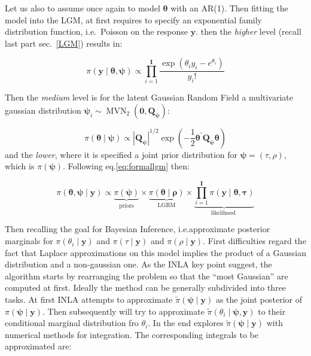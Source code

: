 \documentclass[
  12pt,
  a4paper,
  oneside]{book}
\theoremstyle{definition}
\theoremstyle{definition}
\theoremstyle{definition}
\theoremstyle{remark}
\begin{document}
Let us also to assume once again to model \(\boldsymbol\theta\) with an AR(1).
Then fitting the model into the LGM, at first requires to specify an exponential family distribution function, i.e.~Poisson on the response \(\mathbf{y}\).
then the \emph{higher} level (recall last part sec.~\ref{LGM}) results in:

\[
\pi(\boldsymbol{\mathbf{y}} \mid \boldsymbol{\theta} , \boldsymbol{\psi}) \propto\prod_{i=1}^{\mathbf{I}} \frac{ \exp \left(\theta_{i} y_{i}-e^{\theta_{i}}\right) }{y_{i} !}
\]

Then the \emph{medium} level is for the latent Gaussian Random Field a multivariate gaussian distribution \(\boldsymbol{\psi}_{i} \sim \operatorname{MVN}_{2}(\mathbf{0}, \boldsymbol{Q}_{\boldsymbol{\psi}})\):

\[
\pi(\boldsymbol{\theta} \mid \boldsymbol{\psi}) \propto\left|\boldsymbol{Q}_{\boldsymbol{\psi}}\right|^{1 / 2} \exp \left(-\frac{1}{2} \boldsymbol{\theta}^{\prime} \boldsymbol{Q}_{\boldsymbol{\psi}} \boldsymbol{\theta}\right)
\]
and the \emph{lower}, where it is specified a joint prior distribution for \(\boldsymbol\psi = (\tau, \rho)\), which is \(\pi(\boldsymbol\psi)\). Following eq.\eqref{eq:formallgm} then:

\begin{equation}
\pi(\boldsymbol{\theta}, \boldsymbol{\psi} \mid \mathbf{y})\propto  \underbrace{\pi(\boldsymbol{\psi})}_{\text {priors}} \times \underbrace{\pi(\boldsymbol\theta \mid \boldsymbol\rho)}_{\text {LGRM}} \times \underbrace{\prod_{i=1}^{\mathbf{I}} \pi\left(\mathbf{y} \mid \boldsymbol\theta, \boldsymbol{\tau}\right)}_{\text {likelihood }}
\label{eq:poissonlgm}
\end{equation}

Then recalling the goal for Bayesian Inference, i.e.approximate posterior marginals for \(\pi\left(\theta_{i} \mid \mathbf{y}\right)\) and \(\pi\left(\tau \mid \boldsymbol{\mathbf{y}}\right)\) and \(\pi\left(\rho \mid \boldsymbol{\mathbf{y}}\right)\). First difficulties regard the fact that Laplace approximations on this model implies the product of a Gaussian distribution and a non-gaussian one. As the INLA key point suggest, the algorithm starts by rearranging the problem so that the ``most Gaussian'' are computed at first.
Ideally the method can be generally subdivided into three tasks. At first INLA attempts to approximate \(\tilde{\pi}(\boldsymbol{\psi} \mid \boldsymbol{\mathbf{y}})\) as the joint posterior of \({\pi}(\boldsymbol{\psi} \mid \boldsymbol{\mathbf{y}})\). Then subsequently will try to approximate \(\tilde{\pi}\left(\theta_{i} \mid \boldsymbol\psi, \mathbf{y}\right)\) to their conditional marginal distribution fro \(\theta_i\). In the end explores \(\tilde{\pi}(\boldsymbol{\psi} \mid \boldsymbol{\mathbf{y}})\) with numerical methods for integration.
The corresponding integrals to be approximated are:
\end{document}
